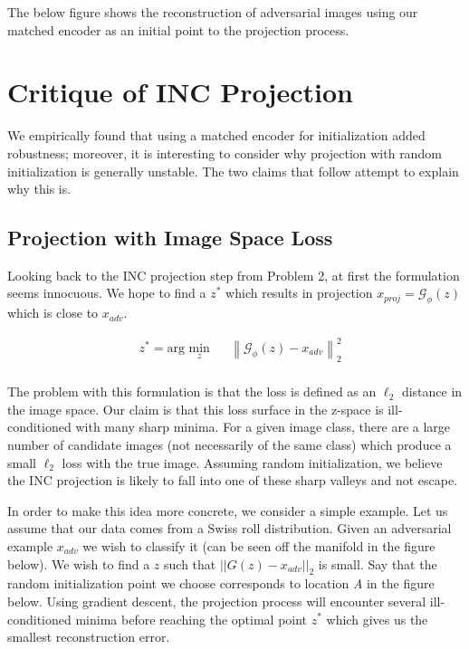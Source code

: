 \documentclass{article}
\theoremstyle{definition}
\newcommand{\norm}[2]{\left\lVert #1 \right\rVert_{#2}}
\begin{document}
The below figure shows the reconstruction of adversarial images using our matched encoder as an initial point to the projection process.


\section{Critique of INC Projection}
We empirically found that using a matched encoder for initialization added robustness; moreover, it is interesting to consider why projection with random initialization is generally unstable. The two claims that follow attempt to explain why this is.

\subsection{Projection with Image Space Loss}
Looking back to the INC projection step from Problem 2, at first the formulation seems innocuous. We hope to find a $z^*$ which results in projection $x_{proj} = \mathcal{G}_{\phi}(z)$ which is close to $x_{adv}$.

\begin{equation*}
\begin{aligned}
& z^* = \text{arg } \underset{z}{\text{min}}
& & \norm{\mathcal{G}_{\phi}(z)-x_{adv}}{2}^2 \\
\end{aligned}
\end{equation*}

The problem with this formulation is that the loss is defined as an $\ell_2$ distance in the image space. Our claim is that this loss surface in the z-space is ill-conditioned with many sharp minima. For a given image class, there are a large number of candidate images (not necessarily of the same class) which produce a small $\ell_2$ loss with the true image. Assuming random initialization, we believe the INC projection is likely to fall into one of these sharp valleys and not escape.

In order to make this idea more concrete, we consider a simple example. Let us assume that our data comes from a Swiss roll distribution. Given an adversarial example $x_{adv}$ we wish to classify it (can be seen off the manifold in the figure below). We wish to find a $z$ such that $||G(z) - x_{adv}||_2$ is small. Say that the random initialization point we choose corresponds to location \emph{A} in the figure below. Using gradient descent, the projection process will encounter several ill-conditioned minima before reaching the optimal point $z^*$ which gives us the smallest reconstruction error.
\end{document}
